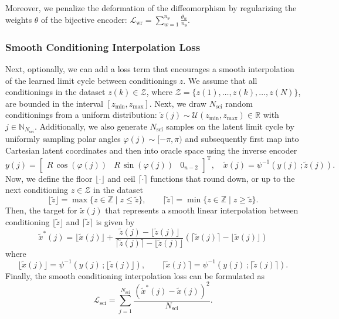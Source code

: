 Moreover, we penalize the deformation of the diffeomorphism by regularizing the weights $\theta$ of the bijective encoder: $\mathcal{L}_\mathrm{wr} = \sum_{w=1}^{n_\theta} \frac{\theta_w}{n_\theta}$.

\subsubsection{Smooth Conditioning Interpolation Loss}
Next, optionally, we can add a loss term that encourages a smooth interpolation of the learned limit cycle between conditionings $z$. We assume that all conditionings in the dataset $z(k) \in \mathcal{Z}$, where $\mathcal{Z} = \{ z(1), \dots, z(k), \dots, z(N) \}$, are bounded in the interval $[z_\mathrm{min}, z_\mathrm{max}]$.
Next, we draw $N_\mathrm{sci}$ random conditionings from a uniform distribution: $\tilde{z}(j) \sim \mathcal{U}(z_\mathrm{min}, z_\mathrm{max}) \in \mathbb{R}$ with $j \in \mathbb{N}_{N_\mathrm{sci}}$.
Additionally, we also generate $N_\mathrm{sci}$ samples on the latent limit cycle by uniformly sampling polar angles $\varphi(j) \sim [-\pi, \pi)$ and subsequently first map into Cartesian latent coordinates and then into oracle space using the inverse encoder
\begin{equation}
    y(j) = \begin{bmatrix}
        R \, \cos(\varphi(j)) & R \, \sin(\varphi(j)) & 0_{n-2}
    \end{bmatrix}^\mathrm{T},
    \quad
    \tilde{x}(j) = \psi^{-1}(y(j) \, ; \tilde{z}(j)).
\end{equation}
Now, we define the floor $\lfloor \cdot \rfloor$ and ceil $\lceil \cdot \rceil$ functions that round down, or up to the next conditioning $z \in \mathcal{Z}$ in the dataset
\begin{equation}
    \lfloor \tilde{z} \rfloor = \max\{ z \in \mathbb{Z} \mid z \le \tilde{z} \},
    \qquad
    \lceil \tilde{z} \rceil = \min\{ z \in \mathbb{Z} \mid z \ge \tilde{z} \}.
\end{equation}
Then, the target for $\tilde{x}(j)$ that represents a smooth linear interpolation between conditioning $\lfloor \tilde{z} \rfloor $ and $\lceil \tilde{z} \rceil$ is given by
\begin{equation}
    \tilde{x}^*(j) = \lfloor \tilde{x}(j) \rfloor + \frac{\tilde{z}(j) - \lfloor \tilde{z}(j) \rfloor}{\lceil \tilde{z}(j) \rceil - \lfloor \tilde{z}(j) \rfloor} \left ( \lceil \tilde{x}(j) \rceil - \lfloor \tilde{x}(j) \rfloor \right )
\end{equation}
where
\begin{equation}
    \lfloor \tilde{x}(j) \rfloor = \psi^{-1}(y(j) \, ; \lfloor \tilde{z}(j) \rfloor),
    \qquad
    \lceil \tilde{x}(j) \rceil = \psi^{-1}(y(j) \, ; \lceil \tilde{z}(j) \rceil).
\end{equation}
Finally, the smooth conditioning interpolation loss can be formulated as
\begin{equation}
    \mathcal{L}_{\mathrm{sci}} = \sum_{j = 1}^{N_\mathrm{sci}} \frac{\left ( \tilde{x}^*(j) - \tilde{x}(j)\right )^2}{N_\mathrm{sci}}.
\end{equation}

